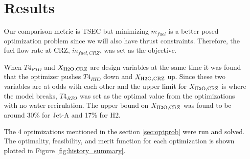 \documentclass[conf]{new-aiaa}
\begin{document}

\section{Results}
\label{sec:results}

Our comparison metric is TSEC but minimizing $\dot{m}_{fuel}$ is a better posed optimization problem since we will also have thrust constraints.
Therefore, the fuel flow rate at CRZ, $\dot{m}_{fuel,CRZ}$, was set as the objective.

When $T4_{RTO}$ and $X_{\rm{H2O,CRZ}}$ are design variables at the same time it was found that the optimizer pushes $T4_{RTO}$ down and $X_{\rm{H2O,CRZ}}$ up.
Since these two variables are at odds with each other and the upper limit for $X_{\rm{H2O,CRZ}}$ is where the model breaks, $T4_{RTO}$ was set as the optimal value from the optimizations with no water recirulation.
The upper bound on $X_{\rm{H2O,CRZ}}$ was found to be around 30\% for Jet-A and 17\% for H2.

The 4 optimizations mentioned in the section \ref{sec:optprob} were run and solved.
The optimality, feasibility, and merit function for each optimization is shown plotted in Figure \ref{fig:history_summary}.
\end{document}
